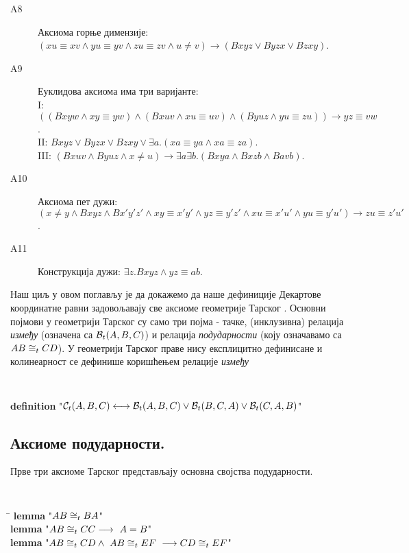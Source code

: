 \begin{description}
\item[A8] Аксиома горње димензије: \\
  $(xu \equiv xv \land yu \equiv yv \land zu \equiv zv \land u \neq v) \to (Bxyz \lor Byzx \lor Bzxy)$.
\item[A9] Еуклидова аксиома има три варијанте:\\
  I: $((Bxyw \land xy \equiv yw) \land (Bxuv \land xu \equiv uv) \land (Byuz \land yu \equiv zu)) \to yz \equiv vw$. \\
  II: $Bxyz \lor Byzx \lor Bzxy \lor \exists a. (xa \equiv ya \land xa \equiv za)$. \\
  III: $(Bxuv \land Byuz \land x \neq u) \to \exists a\exists b. (Bxya \land Bxzb \land Bavb)$.
\item[A10] Аксиома пет дужи: \\
  $(x \neq y \land Bxyz \land Bx'y'z' \land xy \equiv x'y' \land yz \equiv y'z' \land xu \equiv x'u' \land yu \equiv y'u') \to zu \equiv z'u'$.
\item[A11] Конструкција дужи: $\exists z. Bxyz \land yz \equiv ab$.
\end{description}  

Наш циљ у овом поглављу је да докажемо да наше дефиниције Декартове
координатне равни задовољавају све аксиоме геометрије Тарског
\cite{tarski}.  Основни појмови у геометрији Тарског су само три појма
- тачке, (инклузивна) релација \emph{између} (означена са
$\mathcal{B}_t(A, B, C)$) и релација \emph{подударности} (коју означавамо са
$AB \cong_t CD$). У геометрији Тарског праве нису експлицитно
дефинисане и колинеарност се дефинише коришћењем релације
\emph{између} \\ 
 {\tt
\begin{center}
\textbf{definition} "$\mathcal{C}_t(A, B, C) \longleftrightarrow \mathcal{B}_t(A, B, C) \vee \mathcal{B}_t(B, C, A) \vee \mathcal{B}_t(C, A, B)$"
\end{center}
}

\subsection{Аксиоме подударности.}

Прве три аксиоме Тарског представљају основна својства подударности.
{\tt
\begin{tabbing}
\hspace{5mm}\=\kill
\textbf{lemma} "$AB \cong_t BA$"\\
\textbf{lemma} "$AB \cong_t CC \longrightarrow\ A = B$"\\
\textbf{lemma} "$AB \cong_t CD \wedge\ AB \cong_t EF\ \longrightarrow CD \cong_t EF$"
\end{tabbing}
}
\vspace{-2mm}

